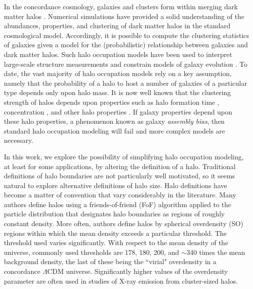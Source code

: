 \documentclass[usenatbib]{mnras}
\begin{document}
In the concordance cosmology, galaxies and clusters form within merging dark matter halos \citep{white_rees78,blumenthal_etal84, mo_etal10}. Numerical simulations have provided a solid understanding of the abundances, properties, and 
clustering of dark matter halos in the standard cosmological model. Accordingly, it is possible to compute the 
clustering statistics of galaxies given a model for the (probabilistic) relationship between galaxies and dark matter halos. 
Such halo occupation models have been used to interpret large-scale structure measurements and 
constrain models of galaxy evolution \citep{yang_etal03,tinker_etal05,zehavi_etal05b,porciani_norberg06,vdbosch_etal07,zheng_etal07,conroy_wechsler09,
yang_etal09b,zehavi_etal11,guo_etal11a,wake_etal11,yang_etal11a,yang_etal12,leauthaud_etal12,
rodriguezpuebla_etal12, behroozi_etal13b, moster_etal13, tinker_etal13,cacciato_etal13,more_etal13,guo_etal14,
zu_mandelbaum15b}.
To date, the vast majority of halo occupation models rely on a key assumption, namely that 
the probability of a halo to host a number of galaxies of a particular type 
depends only upon halo mass. It is now well known that the clustering strength of halos depends upon 
properties such as halo formation time \citep{gao_etal05,harker_etal06, wechsler_etal06,gao_white07,croton_etal07,zentner07,dalal_etal08, li_etal08, lacerna_padilla11}, 
concentration \citep{wechsler_etal06,faltenbacher_white10, mao_etal15}, and other halo properties \citep{bett_etal06, hahn_etal07a, hahn_etal07b, faltenbacher_white10, vandaalen_etal12, fisher_faltenbacher16, sunayama_etal16, chavesmontero_etal16}. 
If galaxy properties depend upon these halo properties, a phenomenon known as galaxy {\em assembly bias}, 
then standard halo occupation modeling will fail \citep{zentner_etal14} 
and more complex models \citep{gilmarin_etal11, hearin_etal16} are necessary.


In this work, we explore the possibility of simplifying halo occupation modeling, at least for some 
applications, by altering the definition of a halo. Traditional definitions of halo boundaries are 
not particularly well motivated, so it seems natural to explore alternative definitions of halo size. 
Halo definitions have become a matter of convention that vary considerably in the literature. Many 
authors define halos using a friends-of-friend (FoF) algorithm applied to the particle distribution that designates 
halo boundaries as regions of roughly constant density. More often, authors define halos by spherical 
overdensity (SO) regions within which the mean density exceeds a particular threshold. The threshold used 
varies significantly. With respect to the mean density of the universe, 
commonly used thresholds are 178, 180, 200, and $\sim$340 times the mean 
background density, the last of these being the ``virial" overdensity in a concordance $\Lambda$CDM universe. 
Significantly higher values of the overdensity parameter are often used in studies of X-ray emission 
from cluster-sized halos.
\end{document}
